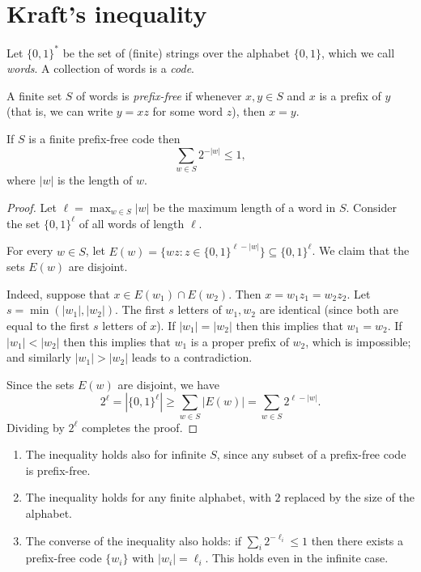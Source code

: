 \section{Kraft's inequality}

Let $\{0,1\}^*$ be the set of (finite) strings over the alphabet $\{0,1\}$, which we call \emph{words}. A collection of words is a \emph{code}.

\begin{definition}
A finite set $S$ of words is \emph{prefix-free} if whenever $x,y \in S$ and $x$ is a prefix of $y$ (that is, we can write $y = xz$ for some word $z$), then $x = y$.
\end{definition}

\begin{theorem} \label{thm:kraft}
If $S$ is a finite prefix-free code then
\[
 \sum_{w \in S} 2^{-|w|} \leq 1,
\]
where $|w|$ is the length of $w$.
\end{theorem}
\begin{proof}
Let $\ell = \max_{w \in S} |w|$ be the maximum length of a word in $S$. Consider the set $\{0,1\}^\ell$ of all words of length $\ell$.

For every $w \in S$, let $E(w) = \{wz : z \in \{0,1\}^{\ell-|w|}\} \subseteq \{0,1\}^\ell$. We claim that the sets $E(w)$ are disjoint.

Indeed, suppose that $x \in E(w_1) \cap E(w_2)$. Then $x = w_1 z_1 = w_2 z_2$. Let $s = \min(|w_1|,|w_2|)$. The first $s$ letters of $w_1,w_2$ are identical (since both are equal to the first $s$ letters of $x$). If $|w_1| = |w_2|$ then this implies that $w_1 = w_2$. If $|w_1| < |w_2|$ then this implies that $w_1$ is a proper prefix of $w_2$, which is impossible; and similarly $|w_1| > |w_2|$ leads to a contradiction.

Since the sets $E(w)$ are disjoint, we have
\[
 2^\ell = |\{0,1\}^\ell| \geq \sum_{w \in S} |E(w)| = \sum_{w \in S} 2^{\ell-|w|}.
\]
Dividing by $2^\ell$ completes the proof.
\end{proof}

\begin{remark}
\begin{enumerate}
    \item The inequality holds also for infinite $S$, since any subset of a prefix-free code is prefix-free.

    \item The inequality holds for any finite alphabet, with $2$ replaced by the size of the alphabet.

    \item The converse of the inequality also holds: if $\sum_i 2^{-\ell_i} \leq 1$ then there exists a prefix-free code $\{w_i\}$ with $|w_i| = \ell_i$. This holds even in the infinite case.
\end{enumerate}
\end{remark}

